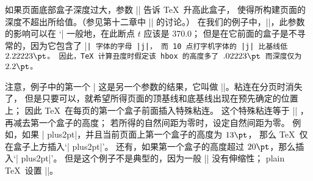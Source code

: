 \ddanger 如果页面底部盒子深度过大，参数 |\maxdepth| 告诉 \TeX\ 升高此盒子，
使得所构建页面的深度不超出所给值。（参见第十二章中 |\boxmaxdepth| 的讨论。）
在我们的例子中，|\maxdepth=2.2pt|，此参数的影响可以在 `|%
一般地，在此断点 $t$ 应该是 370.0；
但是在它前面的盒子是不寻常的，因为它包含了 |\tt| 字体的字母 |j|，
而 10 点打字机字体的 |j| 比基线低 $2.22223\pt$。
因此，\TeX\ 计算丑度时假定该 hbox 的高度多了 $.02223\pt$ 而深度仅为 $2.2\pt$。

\ddanger 注意，例子中的第一个 |%
这是另一个参数的结果，它叫做 |\topskip|。粘连在分页时消失了，
但是只要可以，就希望所得页面的顶基线和底基线出现在预先确定的位置上；
\1因此 \TeX\ 在每页的第一个盒子前面插入特殊粘连。
这个特殊粘连等于 |\topskip| ，再减去第一个盒子的高度；
若所得的自然间距为零时，设定自然间距为零。
例如，如果 |\topskip=20pt plus2pt|，并且当前页面上第一个盒子的高度为 $13\pt$，
那么 \TeX\ 仅在盒子上方插入`|\vskip7pt plus2pt|'。
还有，如果第一个盒子的高度超过 $20\pt$，那么插入`|\vskip0pt plus2pt|'。
但是这个例子不是典型的，因为一般 |\topskip| 没有伸缩性；
plain \TeX\ 设置 |\topskip=10pt|。

